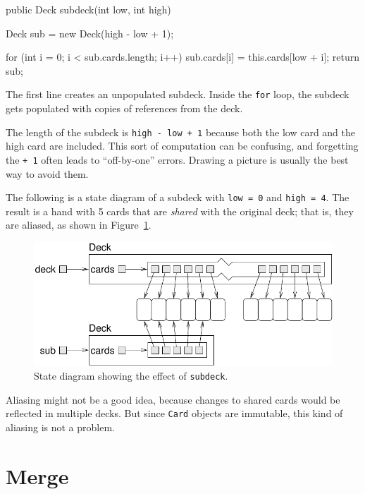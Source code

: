\documentclass[12pt]{book}
\theoremstyle{exercise}
\newcommand{\java}[1]{\verb"#1"}
\begin{document}
\begin{code}
public Deck subdeck(int low, int high) {
    Deck sub = new Deck(high - low + 1);

    for (int i = 0; i < sub.cards.length; i++) {
        sub.cards[i] = this.cards[low + i];
    }
    return sub;
}
\end{code}

The first line creates an unpopulated subdeck.
Inside the \java{for} loop, the subdeck gets populated with copies of references from the deck.

The length of the subdeck is \java{high - low + 1} because both the low card and the high card are included.
This sort of computation can be confusing, and forgetting the \java{+ 1} often leads to ``off-by-one'' errors.
Drawing a picture is usually the best way to avoid them.


The following is a state diagram of a subdeck with \java{low = 0} and \java{high = 4}.
The result is a hand with 5 cards that are {\em shared} with the original deck; that is, they are aliased, as shown in Figure~\ref{fig.subdeck}.

\begin{figure}
\begin{center}
\includegraphics{figs/subdeck.pdf}
\caption{State diagram showing the effect of \java{subdeck}.}
\label{fig.subdeck}
\end{center}
\end{figure}


Aliasing might not be a good idea, because changes to shared cards would be reflected in multiple decks.
But since \java{Card} objects are immutable, this kind of aliasing is not a problem.


\section{Merge}
\end{document}
